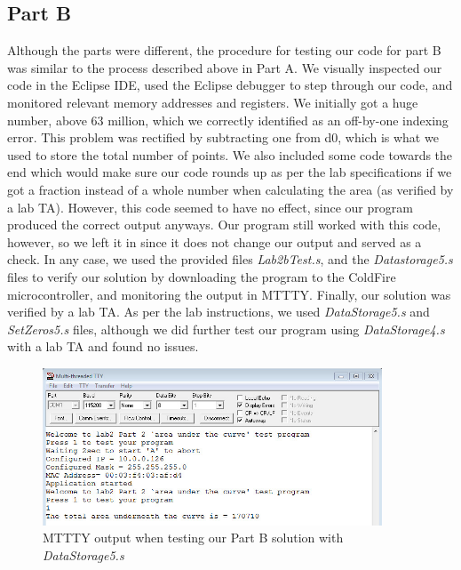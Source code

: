 \documentclass[letterpaper]{article}
\begin{document}
  \subsection{Part B}
    Although the parts were different, the procedure for testing our code for
    part B was similar to the process described above in Part A. We visually
    inspected our code in the Eclipse IDE, used the Eclipse debugger to step
    through our code, and monitored relevant memory addresses and registers. We
    initially got a huge number, above 63 million, which we correctly identified
    as an off-by-one indexing error. This problem was rectified by subtracting
    one from d0, which is what we used to store the total number of points. We
    also included some code towards the end which  would make sure our code
    rounds up as per the lab specifications if we got a fraction instead of a
    whole number when calculating the area (as verified by a lab TA). However,
    this code seemed to have no effect, since our program produced the correct
    output anyways. Our program still worked with this code, however, so we left
    it in since it does not change our output and served as a check. In any
    case, we used the provided files \textit{Lab2bTest.s}, and the
    \textit{Datastorage5.s} files to verify our solution by downloading the
    program to the ColdFire microcontroller, and monitoring the output in MTTTY.
    Finally, our solution was verified by a lab TA. As per the lab instructions,
    we used \textit{DataStorage5.s} and \textit{SetZeros5.s} files, although we
    did further test our program using \textit{DataStorage4.s} with a lab TA and
    found no issues.



    \begin{figure}[H]
      \centering
      \includegraphics[width=0.9\textwidth]{part2ds5.jpg}
      \caption{MTTTY output when testing our Part B solution with \textit{DataStorage5.s}}
    \end{figure}
\end{document}
